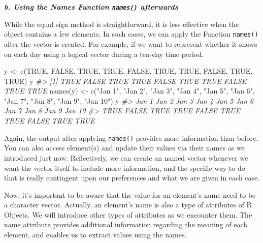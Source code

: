 \documentclass[
]{book}
\newenvironment{Shaded}{\begin{snugshade}}{\end{snugshade}}
\newcommand{\CommentTok}[1]{\textcolor[rgb]{0.56,0.35,0.01}{\textit{#1}}}
\newcommand{\ConstantTok}[1]{\textcolor[rgb]{0.00,0.00,0.00}{#1}}
\newcommand{\FunctionTok}[1]{\textcolor[rgb]{0.00,0.00,0.00}{#1}}
\newcommand{\NormalTok}[1]{#1}
\newcommand{\OtherTok}[1]{\textcolor[rgb]{0.56,0.35,0.01}{#1}}
\newcommand{\StringTok}[1]{\textcolor[rgb]{0.31,0.60,0.02}{#1}}
\begin{document}
\textbf{\emph{b. Using the Names Function \texttt{names()} afterwards}}

While the equal sign method is straightforward, it is less effective when the object contains a few elements. In such cases, we can apply the Function \texttt{names()} after the vector is created. For example, if we want to represent whether it snows on each day using a logical vector during a ten-day time period.

\begin{Shaded}
\begin{Highlighting}[]
\NormalTok{y }\OtherTok{\textless{}{-}} \FunctionTok{c}\NormalTok{(}\ConstantTok{TRUE}\NormalTok{, }\ConstantTok{FALSE}\NormalTok{, }\ConstantTok{TRUE}\NormalTok{, }\ConstantTok{TRUE}\NormalTok{, }\ConstantTok{FALSE}\NormalTok{, }\ConstantTok{TRUE}\NormalTok{, }\ConstantTok{TRUE}\NormalTok{, }\ConstantTok{FALSE}\NormalTok{, }\ConstantTok{TRUE}\NormalTok{, }\ConstantTok{TRUE}\NormalTok{)}
\NormalTok{y}
\CommentTok{\#\textgreater{}  [1]  TRUE FALSE  TRUE  TRUE FALSE  TRUE  TRUE FALSE  TRUE  TRUE}
\FunctionTok{names}\NormalTok{(y) }\OtherTok{\textless{}{-}} \FunctionTok{c}\NormalTok{(}\StringTok{"Jan 1"}\NormalTok{, }\StringTok{"Jan 2"}\NormalTok{, }\StringTok{"Jan 3"}\NormalTok{, }\StringTok{"Jan 4"}\NormalTok{, }\StringTok{"Jan 5"}\NormalTok{, }\StringTok{"Jan 6"}\NormalTok{, }\StringTok{"Jan 7"}\NormalTok{, }\StringTok{"Jan 8"}\NormalTok{, }\StringTok{"Jan 9"}\NormalTok{, }\StringTok{"Jan 10"}\NormalTok{)}
\NormalTok{y}
\CommentTok{\#\textgreater{}  Jan 1  Jan 2  Jan 3  Jan 4  Jan 5  Jan 6  Jan 7  Jan 8  Jan 9 Jan 10 }
\CommentTok{\#\textgreater{}   TRUE  FALSE   TRUE   TRUE  FALSE   TRUE   TRUE  FALSE   TRUE   TRUE}
\end{Highlighting}
\end{Shaded}

Again, the output after applying \texttt{names()} provides more information than before. You can also access element(s) and update their values via their names as we introduced just now. Reflectively, we can create an named vector whenever we want the vector itself to include more information, and the specific way to do that is really contingent upon our preferences and what we are given in each case.

Now, it's important to be aware that the value for an element's name need to be a character vector. Actually, an element's name is also a type of attributes of R Objects. We will introduce other types of attributes as we encounter them. The name attribute provides additional information regarding the meaning of each element, and enables us to extract values using the names.
\end{document}
